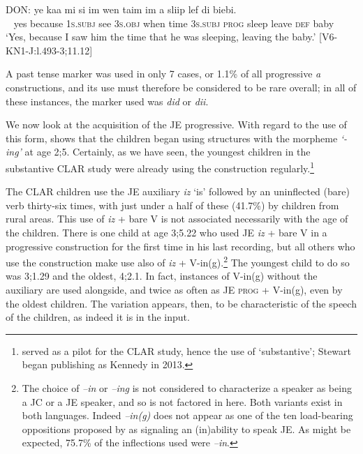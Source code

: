 \documentclass[output=paper,colorlinks,citecolor=brown]{langscibook}
\begin{document}
\ea \label{bkm:messamK:28}
\gll DON:   ye   kaa        mi          si   im       wen   taim im         a        sliip lef       di   biebi.\\
    ~ yes because 1\textsc{s.subj} see 3\textsc{s.obj} when time 3\textsc{s.subj} \textsc{prog} sleep leave \textsc{def} baby\\
\glt \hphantom{DON:} `Yes, because I saw him the time that he was sleeping, leaving the baby.’
                  [V6-KN1-J:l.493-3;11.12]
\z


A past tense marker was used in only 7 cases, or 1.1\% of all progressive \textit{a} constructions, and its use must therefore be considered to be rare overall; in all of these instances, the marker used was \textit{did} or \textit{dii}.

We now look at the acquisition of the JE progressive. With regard to the use of this form, \citet{Stewart2010} shows that the children began using structures with the morpheme \textit{`-ing’} at age 2;5. Certainly, as we have seen, the youngest children in the substantive CLAR study were already using the construction regularly.\footnote{\citet{Stewart2010} served as a pilot for the CLAR study, hence the use of ‘substantive’; Stewart began publishing as Kennedy in 2013.}

The CLAR children use the JE auxiliary \textit{iz} ‘is’ followed by an uninflected (bare) verb thirty-six times, with just under a half of these (41.7\%) by children from rural areas. This use of \textit{iz} + bare V is not associated necessarily with the age of the children. There is one child at age 3;5.22 who used JE \textit{iz} + bare V in a progressive construction for the first time in his last recording, but all others who use the construction make use also of \textit{iz} + V-in(g).\footnote{The choice of \textit{–in} or \textit{–ing} is not considered to characterize a speaker as being a JC or a JE speaker, and so is not factored in here. Both variants exist in both languages. Indeed \textit{–in(g)} does not appear as one of the ten load-bearing oppositions proposed by \citet{irvine2005} as signaling an (in)ability to speak JE. As might be expected, 75.7\% of the inflections used were \textit{–in}.} The youngest child to do so was 3;1.29 and the oldest, 4;2.1. In fact, instances of \textsc{V-}in(g) without the auxiliary are used alongside, and twice as often as JE \textsc{prog} + V-in(g), even by the oldest children. The variation appears, then, to be characteristic of the speech of the children, as indeed it is in the input.
\end{document}
